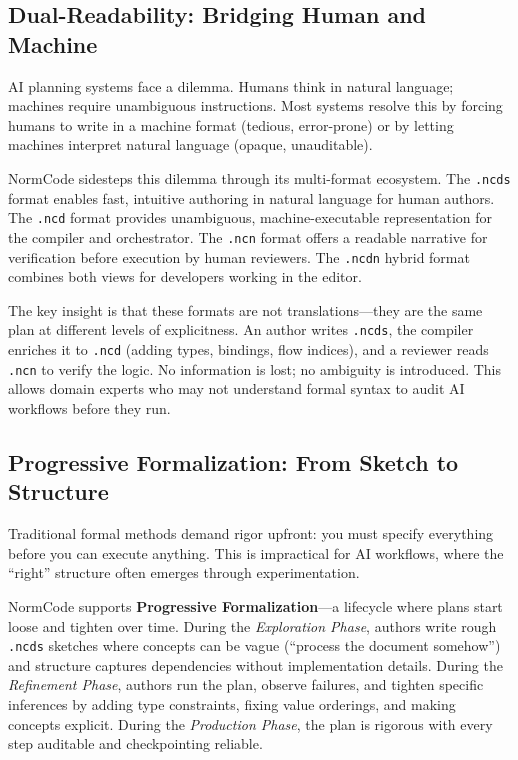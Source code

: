 \subsection{Dual-Readability: Bridging Human and Machine}

AI planning systems face a dilemma. Humans think in natural language; machines require unambiguous instructions. Most systems resolve this by forcing humans to write in a machine format (tedious, error-prone) or by letting machines interpret natural language (opaque, unauditable).

NormCode sidesteps this dilemma through its multi-format ecosystem. The \texttt{.ncds} format enables fast, intuitive authoring in natural language for human authors. The \texttt{.ncd} format provides unambiguous, machine-executable representation for the compiler and orchestrator. The \texttt{.ncn} format offers a readable narrative for verification before execution by human reviewers. The \texttt{.ncdn} hybrid format combines both views for developers working in the editor.

The key insight is that these formats are not translations---they are the same plan at different levels of explicitness. An author writes \texttt{.ncds}, the compiler enriches it to \texttt{.ncd} (adding types, bindings, flow indices), and a reviewer reads \texttt{.ncn} to verify the logic. No information is lost; no ambiguity is introduced. This allows domain experts who may not understand formal syntax to audit AI workflows before they run.


\subsection{Progressive Formalization: From Sketch to Structure}

Traditional formal methods demand rigor upfront: you must specify everything before you can execute anything. This is impractical for AI workflows, where the ``right'' structure often emerges through experimentation.

NormCode supports \textbf{Progressive Formalization}---a lifecycle where plans start loose and tighten over time. During the \textit{Exploration Phase}, authors write rough \texttt{.ncds} sketches where concepts can be vague (``process the document somehow'') and structure captures dependencies without implementation details. During the \textit{Refinement Phase}, authors run the plan, observe failures, and tighten specific inferences by adding type constraints, fixing value orderings, and making concepts explicit. During the \textit{Production Phase}, the plan is rigorous with every step auditable and checkpointing reliable.

